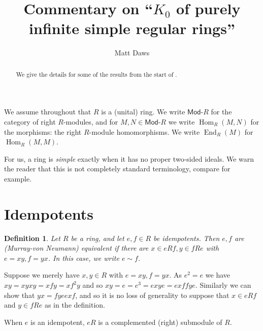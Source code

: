 \documentclass[a4paper,12pt]{article}
\theoremstyle{plain}
\newtheorem{definition}[proposition]{Definition}
\theoremstyle{definition}
\renewcommand{\mod}{\textsf{Mod-}}
\newcommand{\mend}{\operatorname{End}}
\renewcommand{\hom}{\operatorname{Hom}}
\begin{document}
\title{Commentary on ``$K_0$ of purely infinite simple regular rings''}
\author{Matt Daws}
\maketitle

\begin{abstract}
We give the details for some of the results from the start of \cite{agp}.
\end{abstract}

We assume throughout that $R$ is a (unital) ring.  We write $\mod R$ for the category of right
$R$-modules, and for $M,N\in\mod R$ we write $\hom_R(M,N)$ for the morphisms: the right $R$-module
homomorphisms.  We write $\mend_R(M)$ for $\hom_R(M,M)$.

For us, a ring is \emph{simple} exactly when it has no proper two-sided ideals.  We warn the reader
that this is not completely standard terminology, compare \cite[Chapter~XVII, Section~5]{lang} for example.

\section{Idempotents}

\begin{definition}
Let $R$ be a ring, and let $e,f\in R$ be idempotents.  Then $e,f$ are (Murray-von Neumann) \emph{equivalent}
if there are $x\in eRf, y\in fRe$ with $e=xy, f=yx$.  In this case, we write $e\sim f$.
\end{definition}

Suppose we merely have $x,y\in R$ with $e=xy, f=yx$.  As $e^2=e$ we have $xy = xyxy = xfy = xf^2y$ and so
$xy = e = e^3 = exye = exf fye$.  Similarly we can show that $yx = fye exf$, and so it is no loss of
generality to suppose that $x\in eRf$ and $y\in fRe$ as in the definition.

When $e$ is an idempotent, $eR$ is a complemented (right) submodule of $R$.
\end{document}
